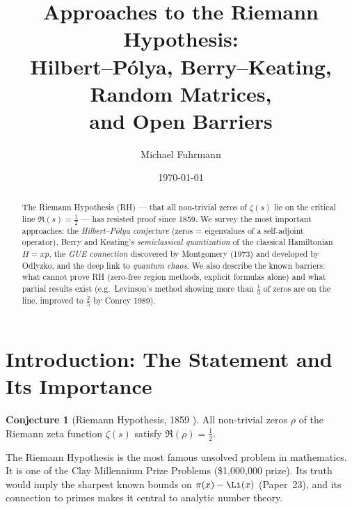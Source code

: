 \documentclass[12pt,a4paper]{amsart}
\theoremstyle{definition}
\newtheorem{conjecture}[theorem]{Conjecture}
\begin{document}

\title{Approaches to the Riemann Hypothesis:\\
       Hilbert--P\'olya, Berry--Keating, Random Matrices,\\
       and Open Barriers}

\author{Michael Fuhrmann}
\address{Specialist Mathematics Project, Build 84}
\date{\today}

\begin{abstract}
The Riemann Hypothesis (RH) --- that all non-trivial zeros of $\zeta(s)$
lie on the critical line $\Re(s) = \tfrac{1}{2}$ --- has resisted proof
since 1859.  We survey the most important approaches:
the \emph{Hilbert--P\'olya conjecture} (zeros = eigenvalues of a self-adjoint
operator), Berry and Keating's \emph{semiclassical quantization} of the
classical Hamiltonian $H = xp$, the \emph{GUE connection} discovered by
Montgomery (1973) and developed by Odlyzko,
and the deep link to \emph{quantum chaos}.
We also describe the known barriers: what cannot prove RH (zero-free region
methods, explicit formulas alone) and what partial results exist
(e.g.\ Levinson's method showing more than $\tfrac{1}{3}$ of zeros are on the line,
improved to $\tfrac{2}{5}$ by Conrey 1989).
\end{abstract}

\maketitle
\tableofcontents

\section{Introduction: The Statement and Its Importance}

\begin{conjecture}[Riemann Hypothesis, 1859 \cite{Riemann1859}]
\label{conj:rh}
All non-trivial zeros $\rho$ of the Riemann zeta function $\zeta(s)$
satisfy $\Re(\rho) = \tfrac{1}{2}$.
\end{conjecture}

The Riemann Hypothesis is the most famous unsolved problem in mathematics.
It is one of the Clay Millennium Prize Problems (\$1,000,000 prize).
Its truth would imply the sharpest known bounds on $\pi(x) - \Li(x)$
(Paper~23), and its connection to primes makes it central to analytic
number theory.
\end{document}
